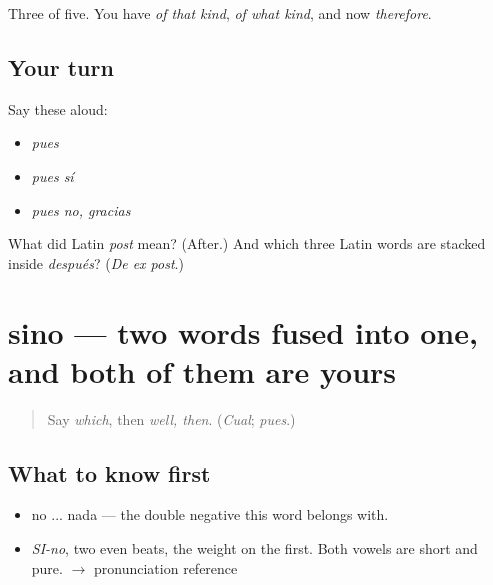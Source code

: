 \begin{grammarlens}[title={What you've built}]
Three of five. You have \emph{of that kind}, \emph{of what kind}, and now \emph{therefore}.
\end{grammarlens}

\subsection*{Your turn}
Say these aloud:

\begin{itemize}
\raggedright
  \item \emph{pues}
  \item \emph{pues sí}
  \item \emph{pues no, gracias}
\end{itemize}

\begin{tcolorbox}[breakable,colback=teal!4,colframe=teal!35!black,title={Before you move on}]
What did Latin \emph{post} mean? (After.) And which three Latin words are stacked inside \emph{después}? (\emph{De ex post}.)
\end{tcolorbox}
\section[sino]{sino — two words fused into one, and both of them are yours}

\label{lesson:ES-C329-sino}



\begin{quote}
Say \emph{which}, then \emph{well, then}. (\emph{Cual}; \emph{pues}.)
\end{quote}

\subsection*{What to know first}
\begin{itemize}
\raggedright
  \item no ... nada — the double negative this word belongs with.
\end{itemize}

\begin{sounds}
\begin{itemize}
\raggedright
  \item \emph{SI-no}, two even beats, the weight on the first. Both vowels are short and pure. $\to$ pronunciation reference
\end{itemize}
\end{sounds}

